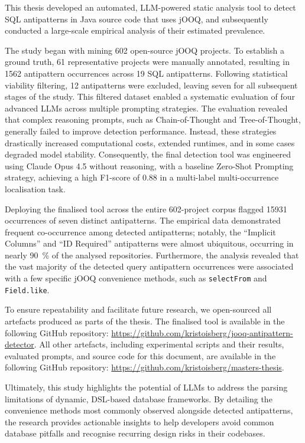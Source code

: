 This thesis developed an automated, LLM-powered static analysis tool to detect SQL antipatterns in Java source code that uses jOOQ, and subsequently conducted a large-scale empirical analysis of their estimated prevalence.

The study began with mining \num{602} open-source jOOQ projects. To establish a ground truth, 61 representative projects were manually annotated, resulting in \num{1562} antipattern occurrences across 19 SQL antipatterns. Following statistical viability filtering, 12 antipatterns were excluded, leaving seven for all subsequent stages of the study. This filtered dataset enabled a systematic evaluation of four advanced LLMs across multiple prompting strategies. The evaluation revealed that complex reasoning prompts, such as Chain-of-Thought and Tree-of-Thought, generally failed to improve detection performance. Instead, these strategies drastically increased computational costs, extended runtimes, and in some cases degraded model stability. Consequently, the final detection tool was engineered using Claude Opus 4.5 without reasoning, with a baseline Zero-Shot Prompting strategy, achieving a high F1-score of \num{0.88} in a multi-label multi-occurrence localisation task.

Deploying the finalised tool across the entire \num{602}-project corpus flagged \num{15931} occurrences of seven distinct antipatterns. The empirical data demonstrated frequent co-occurrence among detected antipatterns; notably, the “Implicit Columns” and “ID Required” antipatterns were almost ubiquitous, occurring in nearly \qty{90}{\percent} of the analysed repositories. Furthermore, the analysis revealed that the vast majority of the detected query antipattern occurrences were associated with a few specific jOOQ convenience methods, such as \texttt{selectFrom} and \texttt{Field.like}.

To ensure repeatability and facilitate future research, we open-sourced all artefacts produced as parts of the thesis. The finalised tool is available in the following GitHub repository: \href{https://github.com/kristoisberg/jooq-antipattern-detector}{https://github.com/kristoisberg/jooq-antipattern-detector}. All other artefacts, including experimental scripts and their results, evaluated prompts, and source code for this document, are available in the following GitHub repository: \href{https://github.com/kristoisberg/masters-thesis}{https://github.com/kristoisberg/masters-thesis}.

Ultimately, this study highlights the potential of LLMs to address the parsing limitations of dynamic, DSL-based database frameworks. By detailing the convenience methods most commonly observed alongside detected antipatterns, the research provides actionable insights to help developers avoid common database pitfalls and recognise recurring design risks in their codebases.
